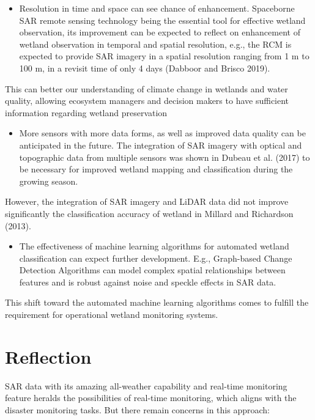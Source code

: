 \documentclass[
  letterpaper,
  DIV=11,
  numbers=noendperiod]{scrreprt}
\providecommand{\tightlist}{%
  \setlength{\itemsep}{0pt}\setlength{\parskip}{0pt}}\usepackage{longtable,booktabs,array}
\begin{document}
\begin{itemize}
\tightlist
\item
  Resolution in time and space can see chance of enhancement. Spaceborne
  SAR remote sensing technology being the essential tool for effective
  wetland observation, its improvement can be expected to reflect on
  enhancement of wetland observation in temporal and spatial resolution,
  e.g., the RCM is expected to provide SAR imagery in a spatial
  resolution ranging from 1 m to 100 m, in a revisit time of only 4 days
  (Dabboor and Brisco 2019).
\end{itemize}

This can better our understanding of climate change in wetlands and
water quality, allowing ecosystem managers and decision makers to have
sufficient information regarding wetland preservation

\begin{itemize}
\tightlist
\item
  More sensors with more data forms, as well as improved data quality
  can be anticipated in the future. The integration of SAR imagery with
  optical and topographic data from multiple sensors was shown in Dubeau
  et al. (2017) to be necessary for improved wetland mapping and
  classification during the growing season.
\end{itemize}

However, the integration of SAR imagery and LiDAR data did not improve
significantly the classification accuracy of wetland in Millard and
Richardson (2013).

\begin{itemize}
\tightlist
\item
  The effectiveness of machine learning algorithms for automated wetland
  classification can expect further development. E.g., Graph-based
  Change Detection Algorithms can model complex spatial relationships
  between features and is robust against noise and speckle effects in
  SAR data.
\end{itemize}

This shift toward the automated machine learning algorithms comes to
fulfill the requirement for operational wetland monitoring systems.

\hypertarget{reflection-7}{%
\section{Reflection}\label{reflection-7}}

SAR data with its amazing all-weather capability and real-time
monitoring feature heralds the possibilities of real-time monitoring,
which aligns with the disaster monitoring tasks. But there remain
concerns in this approach:
\end{document}
